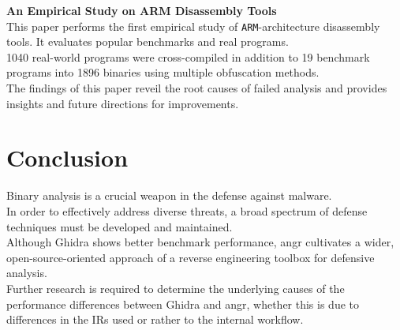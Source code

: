\documentclass[seminar]{plai}
\begin{document}
\noindent\textbf{An Empirical Study on ARM Disassembly Tools}\\
This paper performs the first empirical study of \texttt{ARM}-architecture disassembly tools. It evaluates popular benchmarks and real programs.\\
1040 real-world programs were cross-compiled in addition to 19 benchmark programs into 1896 binaries using multiple obfuscation methods.\\
The findings of this paper reveil the root causes of failed analysis and provides insights and future directions for improvements.\cite{an-empirical-study-on-ARM-disassembly-disassembly-tools} 

\section{Conclusion}
\label{sec:conclusion}
Binary analysis is a crucial weapon in the defense against malware.\\
In order to effectively address diverse threats, a broad spectrum of defense techniques must be developed and maintained.\\
Although Ghidra shows better benchmark performance, angr cultivates a wider, open-source-oriented approach of a reverse engineering toolbox for defensive analysis.\\
Further research is required to determine the underlying causes of the performance differences between Ghidra and angr, whether this is due to differences in the IRs used or rather to the internal workflow. 


\end{document}
